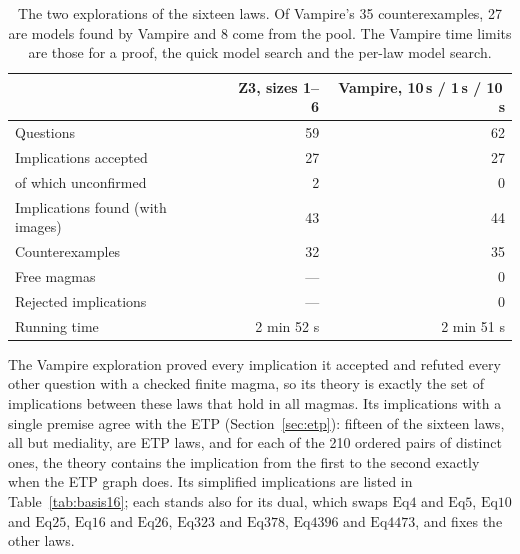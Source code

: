 \documentclass[11pt,a4paper]{article}
\theoremstyle{definition}
\theoremstyle{remark}
\newcommand{\Eq}[1]{\mathrm{Eq}#1}
\begin{document}
\begin{table}[ht]
\centering
\small
\begin{tabular}{@{}lrr@{}}
\toprule
 & Z3, sizes 1--6 & Vampire, 10\,s / 1\,s / 10\,s \\
\midrule
Questions & 59 & 62 \\
Implications accepted & 27 & 27 \\
\quad of which unconfirmed & 2 & 0 \\
Implications found (with images) & 43 & 44 \\
Counterexamples & 32 & 35 \\
Free magmas & --- & 0 \\
Rejected implications & --- & 0 \\
Running time & 2 min 52 s & 2 min 51 s \\
\bottomrule
\end{tabular}
\caption{The two explorations of the sixteen laws. Of Vampire's 35 counterexamples, 27 are models found by Vampire and 8 come from the pool. The Vampire time limits are those for a proof, the quick model search and the per-law model search.}\label{tab:runs16}
\end{table}

The Vampire exploration proved every implication it accepted and refuted every other question with a checked finite magma, so its theory is exactly the set of implications between these laws that hold in all magmas. Its implications with a single premise agree with the ETP (Section~\ref{sec:etp}): fifteen of the sixteen laws, all but mediality, are ETP laws, and for each of the 210 ordered pairs of distinct ones, the theory contains the implication from the first to the second exactly when the ETP graph does. Its simplified implications are listed in Table~\ref{tab:basis16}; each stands also for its dual, which swaps $\Eq{4}$ and $\Eq{5}$, $\Eq{10}$ and $\Eq{25}$, $\Eq{16}$ and $\Eq{26}$, $\Eq{323}$ and $\Eq{378}$, $\Eq{4396}$ and $\Eq{4473}$, and fixes the other laws.
\end{document}
